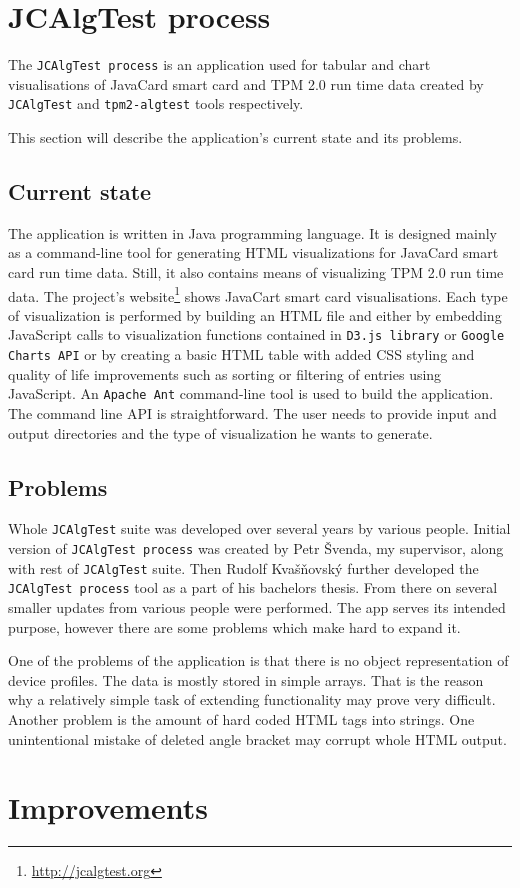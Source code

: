 \section{JCAlgTest process}
The \texttt{JCAlgTest process} is an application used for tabular and chart visualisations of JavaCard smart card and TPM 2.0 run time data created by \texttt{JCAlgTest} and \texttt{tpm2-algtest} tools respectively. 

This section will describe the application's current state and its problems.
\subsection{Current state}
The application is written in Java programming language. It is designed mainly as a command-line tool for generating HTML visualizations for JavaCard smart card run time data. Still, it also contains means of visualizing TPM 2.0 run time data. The project's website\footnote{\url{http://jcalgtest.org}} shows JavaCart smart card visualisations. Each type of visualization is performed by building an HTML file and either by embedding JavaScript calls to visualization functions contained in  \texttt{D3.js library} or \texttt{Google Charts API} or by creating a basic HTML table with added CSS styling and quality of life improvements such as sorting or filtering of entries using JavaScript. An \texttt{Apache Ant} command-line tool is used to build the application. The command line API is straightforward. The user needs to provide input and output directories and the type of visualization he wants to generate. 

\subsection{Problems}
Whole \texttt{JCAlgTest} suite was developed over several years by various people. Initial version of \texttt{JCAlgTest process} was created by Petr Švenda, my supervisor, along with rest of \texttt{JCAlgTest} suite. Then Rudolf Kvašňovský further developed the \texttt{JCAlgTest process} tool as a part of his bachelors thesis. From there on several smaller updates from various people were performed. The app serves its intended purpose, however there are some problems which make hard to expand it.

One of the problems of the application is that there is no object representation of device profiles. The data is mostly stored in simple arrays. That is the reason why a relatively simple task of extending functionality may prove very difficult. Another problem is the amount of hard coded HTML tags into strings. One unintentional mistake of deleted angle bracket may corrupt whole HTML output.

\section{Improvements}
